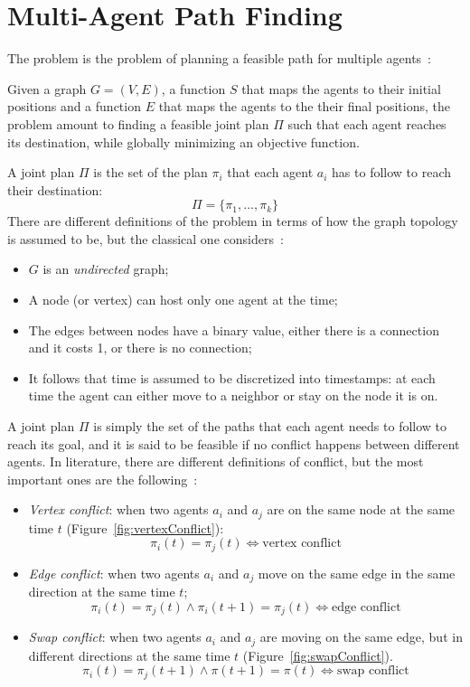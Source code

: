 \section{Multi-Agent Path Finding}
\label{sec:MAPF}
The  problem is the problem of planning a feasible path for multiple
agents~\cite{MAPF_definitions}:
\begin{definition}
  Given a graph $G=(V,E)$, a function $S$ that maps the agents to their initial
  positions and a function $E$ that maps the agents to the their final
  positions, the problem amount to finding a feasible joint plan $\Pi$ such
  that each agent reaches its destination, while globally minimizing an
  objective function.
\end{definition}
A joint plan $\Pi$ is the set of the plan $\pi_i$ that each agent $a_i$ has to
follow to reach their destination: 
\[\Pi=\{\pi_1, \hdots, \pi_k\}\]
There are different definitions of the problem in terms of how the graph 
topology is assumed to be, but the classical one
considers~\cite{MAPF_definitions}:
\begin{itemize}
  \item $G$ is an \textit{undirected} graph;
  \item A node (or vertex) can host only one agent at the time;
  \item The edges between nodes have a binary value, either there is a
    connection and it costs 1, or there is no connection;
  \item It follows that time is assumed to be discretized into timestamps: at
    each time the agent can either move to a neighbor or stay on the node it is
    on. 
\end{itemize}
A joint plan $\Pi$ is simply the set of the paths that each agent needs to
follow to reach its goal, and it is said to be feasible if no conflict 
happens between different agents. In literature, there are different 
definitions of conflict, but the most important ones are the 
following~\cite{MAPF_overview}: 
\begin{itemize}
  \item \textit{Vertex conflict}: when two agents $a_i$ and $a_j$ are on the 
    same node at the same time $t$ (Figure~\ref{fig:vertexConflict}):
    \[\pi_i(t) = \pi_j(t) \iff \text{vertex conflict}\]
  \item \textit{Edge conflict}: when two agents $a_i$ and $a_j$ move on the 
    same edge in the same direction at the same time $t$;
    \[\pi_i(t) = \pi_j(t) \wedge \pi_i(t+1) = \pi_j(t) \iff \text{edge 
      conflict}\]
  \item \textit{Swap conflict}: when two agents $a_i$ and $a_j$ are moving on 
    the same edge, but in different directions at the same time $t$
    (Figure~\ref{fig:swapConflict}). 
    \[\pi_i(t) = \pi_j(t+1) \wedge \pi(t+1) = \pi(t) \iff \text{swap 
      conflict}\]
\end{itemize}
